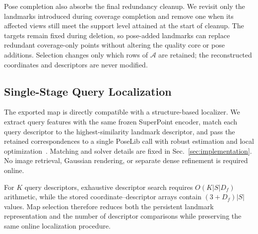 Pose completion also absorbs the final redundancy cleanup. We revisit only the landmarks introduced during coverage completion and remove one when its affected views still meet the support level attained at the start of cleanup. The targets remain fixed during deletion, so pose-added landmarks can replace redundant coverage-only points without altering the quality core or pose additions. Selection changes only which rows of $\mathcal A$ are retained; the reconstructed coordinates and descriptors are never modified.



\subsection{Single-Stage Query Localization}
\label{sec:localization}

The exported map is directly compatible with a structure-based localizer. We extract query features with the same frozen SuperPoint encoder, match each query descriptor to the highest-similarity landmark descriptor, and pass the retained correspondences to a single PoseLib call with robust estimation and local optimization~\cite{poselib,fischler1981ransac}. Matching and solver details are fixed in Sec.~\ref{sec:implementation}. No image retrieval, Gaussian rendering, or separate dense refinement is required online.

For $K$ query descriptors, exhaustive descriptor search requires $O(K|S|D_f)$ arithmetic, while the stored coordinate--descriptor arrays contain $(3+D_f)|S|$ values. Map selection therefore reduces both the persistent landmark representation and the number of descriptor comparisons while preserving the same online localization procedure.